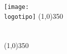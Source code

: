 \begin{titlepage} 
	\begin{center}
	\texttt{[image: \\logotipo]}
	\line(1,0){350} \\ 
		\vspace*{2mm}
	{\Large \uc} \\
		\vspace*{2mm} 	
	{\Huge \titulo} \\
		\vspace*{2mm}
	\line(1,0){350} \\ 
		\vspace*{2mm}
	{\Large \empresa} \\
		\vspace*{20mm}
	{\Large \autores} \\ 
		\vspace*{\fill}
	\end{center}

	\begin{flushright} 
		{\large \departamento} \\ 
		{\versao} 
	\end{flushright}

\end{titlepage}
